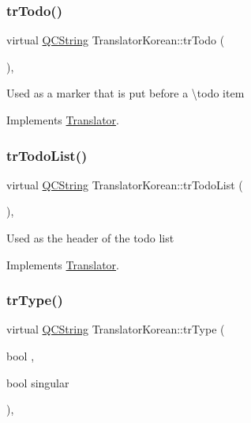 \subsubsection{\texorpdfstring{trTodo()}{trTodo()}}
{\footnotesize\ttfamily virtual \mbox{\hyperlink{class_q_c_string}{Q\+C\+String}} Translator\+Korean\+::tr\+Todo (\begin{DoxyParamCaption}{ }\end{DoxyParamCaption})\hspace{0.3cm}{\ttfamily [inline]}, {\ttfamily [virtual]}}

Used as a marker that is put before a \textbackslash{}todo item 

Implements \mbox{\hyperlink{class_translator}{Translator}}.

\mbox{\label{class_translator_korean_a0558b670966019e531b1de9291c0ecb7}} 
\subsubsection{\texorpdfstring{trTodoList()}{trTodoList()}}
{\footnotesize\ttfamily virtual \mbox{\hyperlink{class_q_c_string}{Q\+C\+String}} Translator\+Korean\+::tr\+Todo\+List (\begin{DoxyParamCaption}{ }\end{DoxyParamCaption})\hspace{0.3cm}{\ttfamily [inline]}, {\ttfamily [virtual]}}

Used as the header of the todo list 

Implements \mbox{\hyperlink{class_translator}{Translator}}.

\mbox{\label{class_translator_korean_a6cf3e25885e35207ff84754d5d684fa1}} 
\subsubsection{\texorpdfstring{trType()}{trType()}}
{\footnotesize\ttfamily virtual \mbox{\hyperlink{class_q_c_string}{Q\+C\+String}} Translator\+Korean\+::tr\+Type (\begin{DoxyParamCaption}\item[{bool}]{,  }\item[{bool}]{singular }\end{DoxyParamCaption})\hspace{0.3cm}{\ttfamily [inline]}, {\ttfamily [virtual]}}

